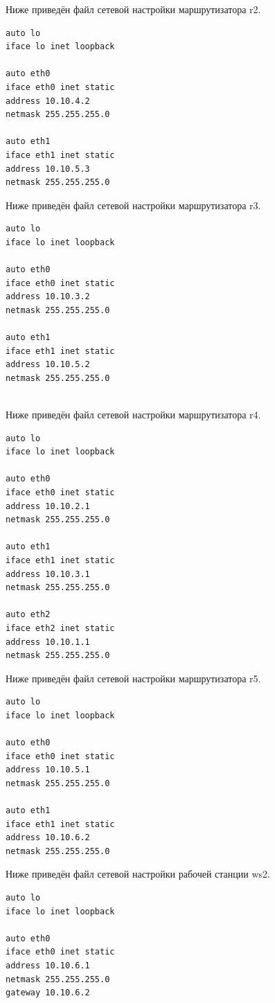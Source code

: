 \documentclass[a4paper,12pt]{article}
\begin{document}
Ниже приведён файл сетевой настройки  маршрутизатора r2.

\begin{Verbatim}
auto lo
iface lo inet loopback

auto eth0
iface eth0 inet static
address 10.10.4.2
netmask 255.255.255.0

auto eth1
iface eth1 inet static
address 10.10.5.3
netmask 255.255.255.0
\end{Verbatim}

Ниже приведён файл сетевой настройки  маршрутизатора r3.

\begin{Verbatim}
auto lo
iface lo inet loopback

auto eth0
iface eth0 inet static
address 10.10.3.2
netmask 255.255.255.0

auto eth1
iface eth1 inet static
address 10.10.5.2
netmask 255.255.255.0


\end{Verbatim}

Ниже приведён файл сетевой настройки  маршрутизатора r4.

\begin{Verbatim}
auto lo
iface lo inet loopback

auto eth0
iface eth0 inet static
address 10.10.2.1
netmask 255.255.255.0

auto eth1
iface eth1 inet static
address 10.10.3.1
netmask 255.255.255.0

auto eth2
iface eth2 inet static
address 10.10.1.1
netmask 255.255.255.0

\end{Verbatim}

Ниже приведён файл сетевой настройки  маршрутизатора r5.

\begin{Verbatim}
auto lo
iface lo inet loopback

auto eth0
iface eth0 inet static
address 10.10.5.1
netmask 255.255.255.0

auto eth1
iface eth1 inet static
address 10.10.6.2
netmask 255.255.255.0

\end{Verbatim}



Ниже приведён файл сетевой настройки рабочей станции ws2.

\begin{Verbatim}
auto lo
iface lo inet loopback

auto eth0
iface eth0 inet static
address 10.10.6.1
netmask 255.255.255.0
gateway 10.10.6.2

\end{Verbatim}
\end{document}
